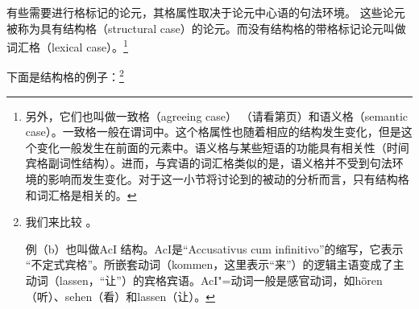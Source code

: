 有些需要进行格标记的论元，其格属性取决于论元中心语的句法环境。
这些论元被称为具有结构格（structural case）的论元。而没有结构格的带格标记论元叫做词汇格（lexical case）。\footnote{%
另外，它们也叫做一致格（agreeing case） （请看第\pageref{page-Kasuskongruenz}页）和语义格（semantic case）。一致格一般在谓词中。这个格属性也随着相应的结构发生变化，但是这个变化一般发生在前面的元素中。语义格与某些短语的功能具有相关性（\egc 时间宾格副词性结构）。进而，与宾语的词汇格类似的是，语义格并不受到句法环境的影响而发生变化。对于这一小节将讨论到的被动的分析而言，只有结构格和词汇格是相关的。
}

下面是结构格的例子：\footnote{%
我们来比较 。

例（b）也叫做AcI 结构。AcI是“Accusativus cum infinitivo”的缩写，它表示 “不定式宾格”。所嵌套动词（kommen，这里表示“来”）的逻辑主语变成了主动词（lassen，“让”）的宾格宾语。AcI"=动词一般是感官动词，如hören（听）、sehen（看）和lassen（让）。
}

